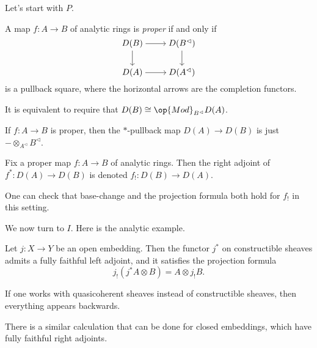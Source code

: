 \documentclass{article}
\begin{document}
Let's start with $P$.
\begin{definition}
	A map $f\colon A\to B$ of analytic rings is \textit{proper} if and only if
	\[\begin{tikzcd}[cramped]
		{D(B)} & {D(B^\vartriangleleft)} \\
		{D(A)} & {D(A^\vartriangleleft)}
		\arrow[from=1-1, to=1-2]
		\arrow[from=1-1, to=2-1]
		\arrow[from=1-2, to=2-2]
		\arrow[from=2-1, to=2-2]
	\end{tikzcd}\]
	is a pullback square, where the horizontal arrows are the completion functors.
\end{definition}
\begin{remark}
	It is equivalent to require that $D(B)\cong\op{Mod}_{B^\vartriangleleft}D(A)$.
\end{remark}
\begin{remark}
	If $f\colon A\to B$ is proper, then the $*$-pullback map $D(A)\to D(B)$ is just $-\otimes_{A^\vartriangleleft}B^\vartriangleleft$.
\end{remark}
\begin{definition}
	Fix a proper map $f\colon A\to B$ of analytic rings. Then the right adjoint of $f^*\colon D(A)\to D(B)$ is denoted $f_!\colon D(B)\to D(A)$.
\end{definition}
\begin{remark}
	One can check that base-change and the projection formula both hold for $f_!$ in this setting.
\end{remark}
We now turn to $I$. Here is the analytic example.
\begin{example}
	Let $j\colon X\to Y$ be an open embedding. Then the functor $j^*$ on constructible sheaves admits a fully faithful left adjoint, and it satisfies the projection formula
	\[j_!(j^*A\otimes B)=A\otimes j_!B.\]
\end{example}
\begin{remark}
	If one works with quasicoherent sheaves instead of constructible sheaves, then everything appears backwards.
\end{remark}
\begin{remark}
	There is a similar calculation that can be done for closed embeddings, which have fully faithful right adjoints.
\end{remark}
\end{document}
